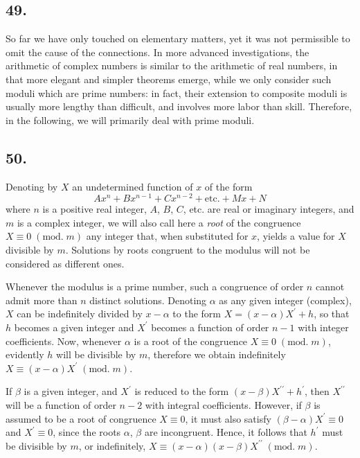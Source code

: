 \documentclass[twoside,12pt, showframe]{memoir}
\renewcommand{\pmod}[1]{\;(\textrm{mod.}\;#1)}
\begin{document}
\subsection*{49.}

So far we have only touched on elementary matters, yet it was not permissible to omit the cause of the connections. In more advanced investigations, the arithmetic of complex numbers is similar to the arithmetic of real numbers, in that more elegant and simpler theorems emerge, while we only consider such moduli which are prime numbers: in fact, their extension to composite moduli is usually more lengthy than difficult, and involves more labor than skill. Therefore, in the following, we will primarily deal with prime moduli.
%

\subsection*{50.}

Denoting by \(X\) an undetermined function of \(x\) of the form
\[A x^{n}+B x^{n-1}+C x^{n-2}+\text{etc.}+M x+N\]
where \(n\) is a positive real integer, \(A\), \(B\), \(C\), etc. are real or imaginary integers, and \(m\) is a complex integer, we will also call here a \textit{root} of the congruence \(X \equiv 0\pmod{m}\) any integer that, when substituted for \(x\), yields a value for \(X\) divisible by \(m\). Solutions by roots congruent to the modulus will not be considered as different ones.

Whenever the modulus is a prime number, such a congruence of order \(n\) cannot admit more than \(n\) distinct solutions. Denoting \(\alpha\) as any given integer (complex), \(X\) can be indefinitely divided by \(x-\alpha\) to the form \(X=(x-\alpha) X^{\prime}+h\), so that \(h\) becomes a given integer and \(X^{\prime}\) becomes a function of order \(n-1\) with integer coefficients. Now, whenever \(\alpha\) is a root of the congruence \(X \equiv 0\pmod{m}\), evidently \(h\) will be divisible by \(m\), therefore we obtain indefinitely \(X \equiv(x-\alpha) X^{\prime}\pmod{m}\).
%

If \(\beta\) is a given integer, and \(X^{\prime}\) is reduced to the form \((x-\beta) X^{\prime \prime}+h^{\prime}\), then \(X^{\prime \prime}\) will be a function of order \(n-2\) with integral coefficients. However, if \(\beta\) is assumed to be a root of congruence \({X} \equiv 0\), it must also satisfy \((\beta-\alpha) X^{\prime} \equiv 0\) and \(X^{\prime} \equiv 0\), since the roots \(\alpha\), \(\beta\) are incongruent. Hence, it follows that \(h^{\prime}\) must be divisible by \(m\), or indefinitely, \(X \equiv(x-\alpha)(x-\beta) X^{\prime \prime}\pmod{m}\).
\end{document}

